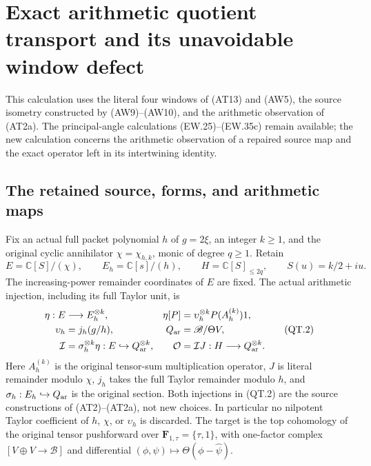 \section{Exact arithmetic quotient transport and its unavoidable window defect}
\label{sec:qt-transport}

This calculation uses the literal four windows of (AT13) and (AW5),
the source isometry constructed by (AW9)--(AW10), and the arithmetic
observation of (AT2a). The principal-angle calculations (EW.25)--(EW.35c)
remain available; the new calculation concerns the arithmetic observation
of a repaired source map and the exact operator left in its intertwining
identity.

\subsection{The retained source, forms, and arithmetic maps}

Fix an actual full packet polynomial \(h\) of \(g=2\xi\), an integer
\(k\ge1\), and the original cyclic annihilator \(\chi=\chi_{h,k}\),
monic of degree \(q\ge1\). Retain
\[
 E=\mathbb C[S]/(\chi),\qquad E_h=\mathbb C[s]/(h),\qquad
 H=\mathbb C[S]_{\le2q},\qquad S(u)=k/2+iu.
 \tag{QT.1}\label{eq:qt-objects}
\]
The increasing-power remainder coordinates of \(E\) are fixed.
The actual arithmetic injection, including its full Taylor unit, is
\[
 \begin{aligned}
 \eta:E&\longrightarrow E_h^{\otimes k},&
 \eta[P]&=\upsilon_h^{\otimes k}P(A_h^{(k)})1,\\
 \upsilon_h&=j_h(g/h),&
 Q_{\rm ar}&=\mathscr B/\Theta V,\\
 \mathcal I&=\sigma_h^{\otimes k}\eta:
                  E\hookrightarrow Q_{\rm ar}^{\otimes k},&
 \mathcal O&=\mathcal I J:H\longrightarrow Q_{\rm ar}^{\otimes k}.
 \end{aligned}
 \tag{QT.2}\label{eq:qt-observation}
\]
Here \(A_h^{(k)}\) is the original tensor-sum multiplication operator,
\(J\) is literal remainder modulo \(\chi\), \(j_h\) takes the full
Taylor remainder modulo \(h\), and \(\sigma_h:E_h\hookrightarrow Q_{\rm ar}\)
is the original section. Both injections in (QT.2) are the source
constructions of (AT2)--(AT2a), not new choices. In particular no
nilpotent Taylor coefficient of \(h\), \(\chi\), or \(\upsilon_h\)
is discarded. The target is the top cohomology of the original tensor
pushforward over \(\mathbf F_{1,\tau}=\{\tau,1\}\), with one-factor
complex \([V\oplus V\longrightarrow\mathscr B]\) and differential
\((\phi,\psi)\mapsto\Theta(\phi-\widehat\psi)\).

